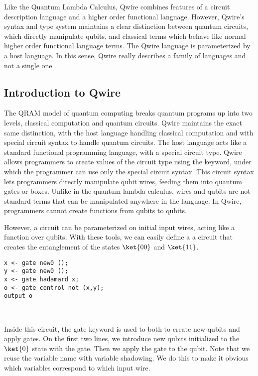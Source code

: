 Like the Quantum Lambda Calculus, Qwire combines features of a circuit description language and a higher order functional language.
However, Qwire's syntax and type system maintains a clear distinction between quantum circuits, which directly manipulate qubits, and classical terms which behave like normal higher order functional language terms.
The Qwire language is parameterized by a host language.
In this sense, Qwire really describes a family of languages and not a single one.

\subsection{Introduction to Qwire}


The QRAM model of quantum computing breaks quantum programs up into two levels, classical computation and quantum circuits.
Qwire maintains the exact same distinction, with the host language handling classical computation and with special circuit syntax to handle quantum circuits.
The host language acts like a standard functional programming language, with a special circuit type.
Qwire allows programmers to create values of the circuit type using the  keyword, under which the programmer can use only the special circuit syntax.
This circuit syntax lets programmers directly manipulate qubit wires, feeding them into quantum gates or boxes.
Unlike in the quantum lambda calculus, wires and qubits are not standard terms that can be manipulated anywhere in the language.
In Qwire, programmers cannot create functions from qubits to qubits.

However, a circuit can be parameterized on initial input wires, acting like a function over qubits. 
With these tools, we can easily define a a circuit that creates the entanglement of the states $\ket{00}$ and $\ket{11}$.

\begin{lstlisting}[style=customcoq]
x <- gate new0 ();
y <- gate new0 ();
x <- gate hadamard x;
o <- gate control not (x,y);
output o
\end{lstlisting}

\\

Inside this circuit, the gate keyword is used to both to create new qubits and apply gates.
On the first two lines, we introduce new qubits initialized to the $\ket{0}$ state with the  gate.
Then we apply the  gate to the  qubit.
Note that we reuse the variable name  with variable shadowing.
We do this to make it obvious which variables correspond to which input wire.

